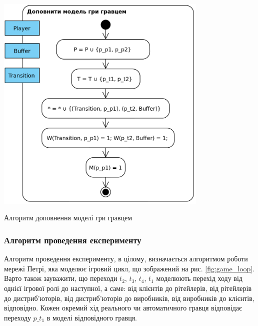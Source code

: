 \begin{stdfigure}  
    \includegraphics[width=4in]{images/add_player.png}
    \caption{Алгоритм доповнення моделі гри гравцем}
    \label{fig:net_add_player}
\end{stdfigure}

\subsubsection{Алгоритм проведення експерименту}
Алгоритм проведення експерименту, в цілому, визначається алгоритмом роботи мережі Петрі, яка моделює ігровий цикл, що зображений на рис. \ref{fig:game_loop}. Варто також зауважити, що переходи $t_2$, $t_3$, $t_4$, $t_1$ моделюють перехід ходу від однієї ігрової ролі до наступної, а саме: від клієнтів до рітейлерів, від рітейлерів до дистриб’юторів, від дистриб’юторів до виробників, від виробників до клієнтів, відповідно. Кожен окремий хід реального чи автоматичного гравця відповідає переходу $p\_t_1$ в моделі відповідного гравця.
 
